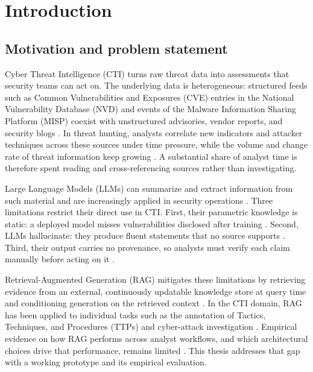 \chapter{Introduction}
\label{ch:introduction}

\section{Motivation and problem statement}
\label{sec:motivation}

Cyber Threat Intelligence (CTI) turns raw threat data into assessments that
security teams can act on. The underlying data is heterogeneous: structured
feeds such as Common Vulnerabilities and Exposures (CVE) entries in the
National Vulnerability Database (NVD) and events of the Malware
Information Sharing Platform (MISP) coexist with unstructured
advisories, vendor reports, and security blogs \parencite{sun2023ctimining}. In threat hunting,
analysts correlate new indicators and attacker techniques across these
sources under time pressure, while the volume and change rate of threat
information keep growing \parencite{rajapaksha2024rag}. A substantial share
of analyst time is therefore spent reading and cross-referencing sources
rather than investigating.

Large Language Models (LLMs) can summarize and extract information from such
material and are increasingly applied in security operations
\parencite{divakaran2024llm}. Three limitations restrict their direct use in
CTI. First, their parametric knowledge is static: a deployed model misses
vulnerabilities disclosed after training \parencite{gao2024rag}. Second,
LLMs hallucinate: they produce fluent statements that no source supports
\parencite{gao2024rag}. Third, their output carries no provenance, so
analysts must verify each claim manually before acting on it
\parencite{rajapaksha2024rag}.

Retrieval-Augmented Generation (RAG) mitigates these limitations by
retrieving evidence from an external, continuously updatable knowledge store
at query time and conditioning generation on the retrieved context
\parencite{lewis2020rag}. In the CTI domain, RAG has been applied to
individual tasks such as the annotation of Tactics, Techniques, and
Procedures (TTPs) and cyber-attack investigation
\parencite{fayyazi2024ttp,rajapaksha2024rag}. Empirical evidence on how RAG
performs across analyst workflows, and which architectural choices drive
that performance, remains limited \parencite{gao2024rag}. This thesis
addresses that gap with a working prototype and its empirical evaluation.


